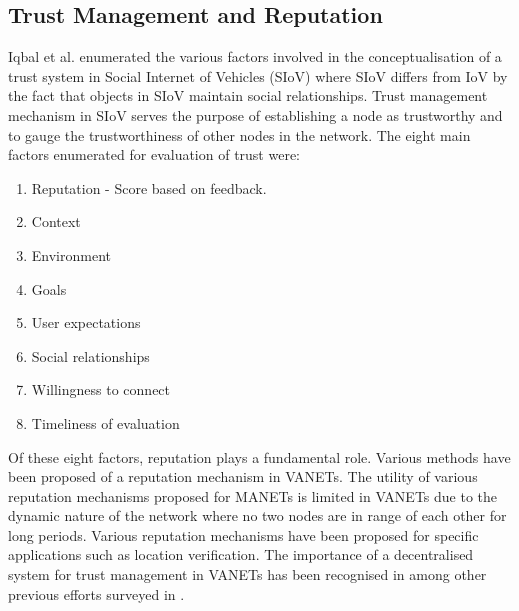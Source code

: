 \documentclass[journal]{IEEEtran}
\begin{document}
\subsection{Trust Management and Reputation}
\label{sec:RV:trust&Reputation}
Iqbal et al. \cite{c:trustInSIoV} enumerated the various factors involved in the conceptualisation of a trust system in Social Internet of Vehicles (SIoV) where SIoV differs from IoV by the fact that objects in SIoV maintain social relationships. Trust management mechanism in SIoV serves the purpose of establishing a node as trustworthy and to gauge the trustworthiness of other nodes in the network. The eight main factors enumerated for evaluation of trust were:\\
	\begin{enumerate}
		\item Reputation - Score based on feedback.
		\item Context
		\item Environment
		\item Goals
		\item User expectations
		\item Social relationships
		\item Willingness to connect
		\item Timeliness of evaluation 
	\end{enumerate}
Of these eight factors, reputation plays a fundamental role. Various methods have been proposed of a reputation mechanism in VANETs. The utility of various reputation mechanisms proposed for MANETs is limited in VANETs due to the dynamic nature of the network where no two nodes are in range of each other for long periods. Various reputation mechanisms have been proposed for specific applications such as location verification\cite{c:positionVerificationRepMech}. The importance of a decentralised system for trust management in VANETs has been recognised in \cite{c:Huang_decentrTrustMechVANETS} among other previous efforts surveyed in \cite{c:trustinVANETsurvey}.
\end{document}
